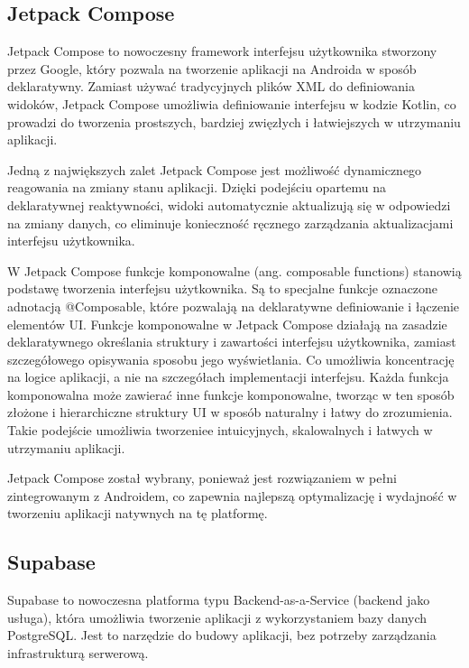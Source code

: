 \documentclass[12pt,twoside]{article}
\begin{document}
\subsection{Jetpack Compose}

Jetpack Compose to nowoczesny framework interfejsu użytkownika stworzony przez Google, który pozwala 
na tworzenie aplikacji na Androida w sposób deklaratywny. Zamiast używać tradycyjnych plików XML do 
definiowania widoków, Jetpack Compose umożliwia definiowanie interfejsu w kodzie Kotlin, co prowadzi 
do tworzenia prostszych, bardziej zwięzłych i łatwiejszych w utrzymaniu aplikacji.

Jedną z największych zalet Jetpack Compose jest możliwość dynamicznego reagowania na zmiany stanu aplikacji. 
Dzięki podejściu opartemu na deklaratywnej reaktywności, widoki automatycznie aktualizują się w odpowiedzi na 
zmiany danych, co eliminuje konieczność ręcznego zarządzania aktualizacjami interfejsu użytkownika.

W Jetpack Compose funkcje komponowalne (ang. composable functions) stanowią podstawę tworzenia interfejsu 
użytkownika. Są to specjalne funkcje oznaczone adnotacją @Composable, które pozwalają na deklaratywne definiowanie 
i łączenie elementów UI. Funkcje komponowalne w Jetpack Compose działają na zasadzie deklaratywnego określania 
struktury i zawartości interfejsu użytkownika, zamiast szczegółowego opisywania sposobu jego wyświetlania. Co 
umożliwia koncentrację na logice aplikacji, a nie na szczegółach implementacji interfejsu. Każda funkcja 
komponowalna może zawierać inne funkcje komponowalne, tworząc w ten sposób złożone i hierarchiczne struktury UI 
w sposób naturalny i łatwy do zrozumienia. Takie podejście umożliwia tworzeniee intuicyjnych, skalowalnych i łatwych 
w utrzymaniu aplikacji.

Jetpack Compose został wybrany, ponieważ jest rozwiązaniem w pełni zintegrowanym z Androidem, 
co zapewnia najlepszą optymalizację i wydajność w tworzeniu aplikacji natywnych na tę platformę.

\subsection{Supabase}

Supabase to nowoczesna platforma typu Backend-as-a-Service (backend jako usługa), która umożliwia tworzenie
aplikacji z wykorzystaniem bazy danych PostgreSQL. Jest to narzędzie do budowy aplikacji, bez potrzeby 
zarządzania infrastrukturą serwerową.
\end{document}
